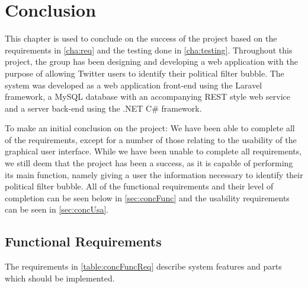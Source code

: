 \chapter{Conclusion}\label{cha:conclusion}
This chapter is used to conclude on the success of the project based on the
requirements in \autoref{cha:req} and the testing done in
\autoref{cha:testing}. Throughout this project, the group has been designing and
developing a web application with the purpose of allowing Twitter users to
identify their political filter bubble. The system was developed as a web
application front-end using the Laravel framework, a MySQL database with an
accompanying REST style web service and a server back-end using the .NET C\#
framework.\nl

To make an initial conclusion on the project: We have been able
to complete all of the requirements, except for a number of those relating to
the usability of the graphical user interface. While we have been unable to
complete all requirements, we still deem that the project has been a success, as
it is capable of performing its main function, namely giving a user the
information necessary to identify their political filter bubble. All of the
functional requirements and their level of completion can be seen below in
\autoref{sec:concFunc} and the usability requirements can be seen in
\autoref{sec:concUsa}.

\section{Functional Requirements}\label{sec:concFunc}
The requirements in \autoref{table:concFuncReq} describe system
features and parts which should be implemented.

